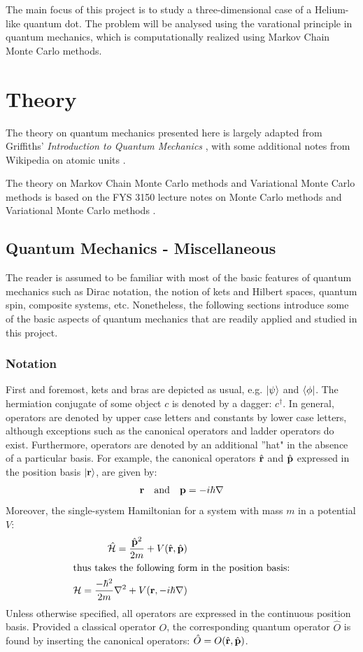 \documentclass[nofootinbib,reprint,english]{revtex4-1}
\newcommand{\hatHH}{\hat{\mathcal{H}}}
\newcommand{\HH}{\mathcal{H}}
\begin{document}
The main focus of this project is to study a three-dimensional case of a Helium-like quantum dot. The problem will be analysed using the varational principle in quantum mechanics, which is computationally realized using Markov Chain Monte Carlo methods.
\section{Theory}
The theory on quantum mechanics presented here is largely adapted from Griffiths' \emph{Introduction to Quantum Mechanics} \cite{Griffiths}, with some additional notes from Wikipedia on atomic units \cite{WikiAtomicUnits}.

The theory on Markov Chain Monte Carlo methods and Variational Monte Carlo methods is based on the FYS 3150 lecture notes on Monte Carlo methods \cite{montecarlo_lec_notes} and Variational Monte Carlo methods \cite{quantum_lec_notes}.
\subsection{Quantum Mechanics - Miscellaneous}
The reader is assumed to be familiar with most of the basic features of quantum mechanics such as Dirac notation, the notion of kets and Hilbert spaces, quantum spin, composite systems, etc. Nonetheless, the following sections introduce some of the basic aspects of quantum mechanics that are readily applied and studied in this project.
\subsubsection{Notation}
First and foremost, kets and bras are depicted as usual, e.g. \(\ket{\psi}\) and \(\bra{\phi}\). The hermiation conjugate of some object \(c\) is denoted by a dagger: \(c^\dagger\). In general, operators are denoted by upper case letters and constants by lower case letters, although exceptions such as the canonical operators and ladder operators do exist. Furthermore, operators are denoted by an additional ''hat" in the absence of a particular basis. For example, the canonical operators \(\hat{\vb{r}}\) and \(\hat{\vb{p}}\) expressed in the position basis \(\ket{\vb{r}}\), are given by:
\begin{equation}
\vb{r}\qand\vb{p}=-i\hbar\nabla
\end{equation}
Moreover, the single-system Hamiltonian for a system with mass \(m\) in a potential \(V\):
\begin{subequations}
\begin{align}
\hatHH=\frac{\hat{\vb{p}}^2}{2m}+V(\hat{\vb{r}},\hat{\vb{p}})\\
\intertext{thus takes the following form in the position basis:}
\HH=\frac{-\hbar^2}{2m}\nabla^2+V(\vb{r},-i\hbar\nabla)
\end{align}
\end{subequations}
Unless otherwise specified, all operators are expressed in the continuous position basis. Provided a classical operator \(O\), the corresponding quantum operator \(\hat{O}\) is found by inserting the canonical operators: \(\hat{O}=O(\hat{\vb{r}},\hat{\vb{p}})\).
\end{document}
